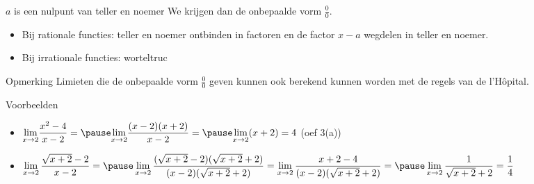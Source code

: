 \documentclass[handout]{beamer}
\newcommand{\ds}{\displaystyle}
\begin{document}
\begin{frame}
\begin{block}{$a$ is een nulpunt van teller en noemer}
We krijgen dan de
onbepaalde vorm $\frac{0}{0}$.
\begin{itemize}


\item Bij rationale functies: teller en noemer
ontbinden in factoren en de factor $x-a$ wegdelen in teller en
noemer. 

\item Bij irrationale functies: worteltruc
\end{itemize}


\end{block}
\begin{alertblock}{Opmerking}
Limieten die de onbepaalde vorm $\frac{0}{0}$ geven kunnen ook berekend kunnen worden met de regels van de l'H\^{o}pital. 
\end{alertblock}
\end{frame}
\begin{frame}
\begin{exampleblock}{Voorbeelden}
\begin{itemize}
	\item 
$\displaystyle{\lim_{x \to 2}} \frac{x^2 - 4 }{x-2}
= \pause \displaystyle{\lim_{x \to 2}} \frac{(x - 2)(x + 2) }{x-2} = \pause
\displaystyle{\lim_{x \to 2}} (x + 2) = 4 $ (oef 3(a))
\item 
$\ds \lim_{x \rightarrow 2} \frac {\sqrt{x+2} -2}{x-2} = \pause \lim_{x \rightarrow 2} \frac {(\sqrt{x+2} -2)(\sqrt{x+2} +2)}{(x-2)(\sqrt{x+2} +2)}= \lim_{x \rightarrow 2} \frac {x+2-4}{(x-2)(\sqrt{x+2} +2)}= \pause\lim_{x \rightarrow 2} \frac {1}{\sqrt{x+2} +2}=\frac14$
\end{itemize}
\end{exampleblock}
\end{frame}
\end{document}
